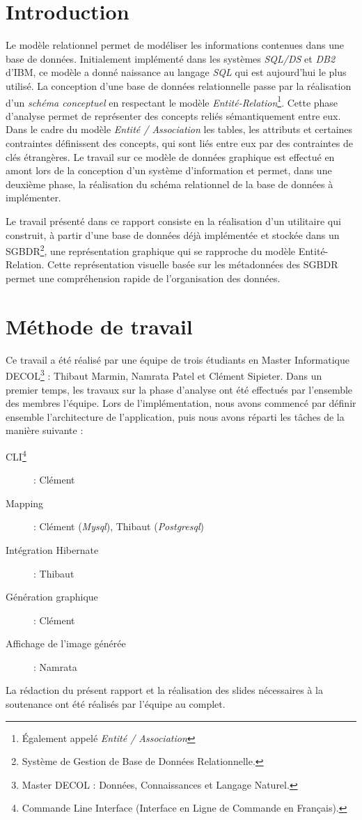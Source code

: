 \chapter*{Introduction}
Le modèle relationnel permet de modéliser les informations contenues dans une base de données. Initialement implémenté dans les systèmes \emph{SQL/DS} et \emph{DB2} d'IBM, ce modèle a donné naissance au langage \emph{SQL} qui est aujourd'hui le plus utilisé. La conception d'une base de données relationnelle passe par la réalisation d'un \emph{schéma conceptuel} en respectant le modèle  \emph{Entité-Relation}\footnote{Également appelé \emph{Entité / Association}}. Cette phase d'analyse permet de représenter des concepts reliés sémantiquement entre eux. Dans le cadre du modèle \emph{Entité / Association} les tables, les attributs et certaines contraintes définissent des concepts, qui sont liés entre eux par des contraintes de clés étrangères. Le travail sur ce modèle de données graphique est effectué en amont lors de la conception d'un système d'information et permet, dans une deuxième phase, la réalisation du schéma relationnel de la base de données à implémenter.

Le travail présenté dans ce rapport consiste en la réalisation d'un utilitaire qui construit, à partir d'une base de données déjà implémentée et stockée dans un SGBDR\footnote{Système de Gestion de Base de Données Relationnelle.}, une représentation graphique qui se rapproche du modèle Entité-Relation. Cette représentation visuelle basée sur les métadonnées des SGBDR permet une compréhension rapide de l'organisation des données.

\clearemptydoublepage
\chapter*{Méthode de travail}
Ce travail a été réalisé par une équipe de trois étudiants en Master Informatique DECOL\footnote{Master DECOL : Données, Connaissances et Langage Naturel.} : Thibaut Marmin, Namrata Patel et Clément Sipieter. Dans un premier temps, les travaux sur la phase d'analyse ont été effectués par l'ensemble des membres l'équipe. Lors de l'implémentation, nous avons commencé par définir ensemble l'architecture de l'application, puis nous avons réparti les tâches de la manière suivante : 

\begin{description}
\item[CLI\footnote{Commande Line Interface (\og Interface en Ligne de Commande \fg{} en Français).}] : Clément
\item[Mapping] : Clément (\emph{Mysql}), Thibaut (\emph{Postgresql})
\item[Intégration Hibernate] : Thibaut
\item[Génération graphique] : Clément
\item[Affichage de l'image générée] : Namrata
\end{description}

La rédaction du présent rapport et la réalisation des slides nécessaires à la soutenance ont été réalisés par l'équipe au complet.